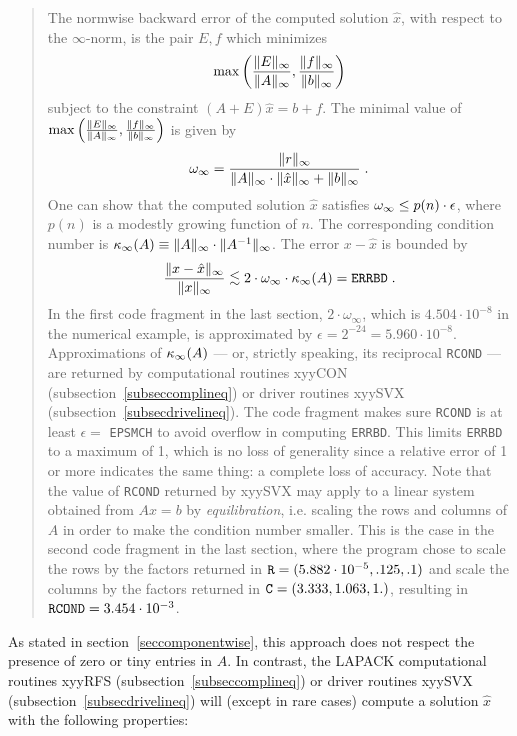 \begin{quote}
The normwise backward error of the computed solution $\hat{x}$,
with respect to the $\infty$-norm,
is the pair $E,f$ which minimizes
\[
\max \left( \frac{\| E \|_{\infty}}{\| A \|_{\infty}} ,
            \frac{\| f \|_{\infty}}{\| b \|_{\infty}} \right)
\]
subject to the constraint $(A+E) \hat{x} = b+f$.
The minimal value of
$\max \left( \frac{\| E \|_{\infty}}{\| A \|_{\infty}} ,
\frac{\| f \|_{\infty}}{\| b \|_{\infty}} \right)$
is given by
\[
\omega_{\infty} =
\frac{\| r \|_{\infty} }{\| A \|_{\infty} \cdot \| \hat{x} \|_{\infty} + \| b \|_{\infty} } \; .
\]
One can show that the computed solution $\hat{x}$
satisfies $\omega_{\infty} \leq p(n) \cdot \epsilon$,
where $p(n)$ is a modestly growing function of $n$.
The corresponding condition number is
$\kappa_{\infty} (A) \equiv \|A\|_{\infty} \cdot \|A^{-1}\|_{\infty}$.
The error $x-\hat{x}$ is bounded by
\[
\frac{\|x- \hat{x} \infnorm}{\| x \infnorm}
\leapproxeq 2 \cdot \omegai \cdot \kappai (A) = {\tt ERRBD} \; .
\]
In the first code fragment in the last section, $2 \cdot \omega_{\infty}$,
which is $4.504 \cdot 10^{-8}$ in the numerical example,
is approximated by $\epsilon  = 2^{-24} = 5.960 \cdot 10^{-8}$.
Approximations
of  $\kappa_{\infty} (A)$ --- or, strictly speaking, its reciprocal {\tt RCOND} ---
are returned by computational routines
xyyCON (subsection~\ref{subseccomplineq}) or driver routines
xyySVX (subsection~\ref{subsecdrivelineq}). The code fragment
makes sure {\tt RCOND} is at least $\epsilon =$ {\tt EPSMCH} to
avoid overflow in computing
{\tt ERRBD}.
This limits
{\tt ERRBD} to a maximum of 1, which is no loss of generality since
a relative error of 1 or more indicates the same thing:
a complete loss of accuracy. 
Note that the
value of {\tt RCOND} returned by xyySVX may apply to a linear
system obtained from $Ax=b$ by {\em equilibration}, i.e.
scaling the rows and columns of $A$ in order to make the
condition number smaller. This is the case in the second
code fragment in the last section, where the program
chose to scale the rows by the factors returned in
${\tt R} = (5.882 \cdot 10^{-5}, .125, .1 )$
and scale the columns by the factors returned in
${\tt C} = (3.333, 1.063, 1. )$,
resulting in ${\tt RCOND} = 3.454 \cdot 10^{-3}$.
\end{quote}

As stated in section~\ref{seccomponentwise},
this approach does not respect the presence
of zero or tiny entries in $A$. In contrast,
the LAPACK computational routines
xyyRFS (subsection~\ref{subseccomplineq}) or driver routines xyySVX
(subsection~\ref{subsecdrivelineq}) will (except in rare cases)
compute a solution $\hat{x}$ with the following properties:

